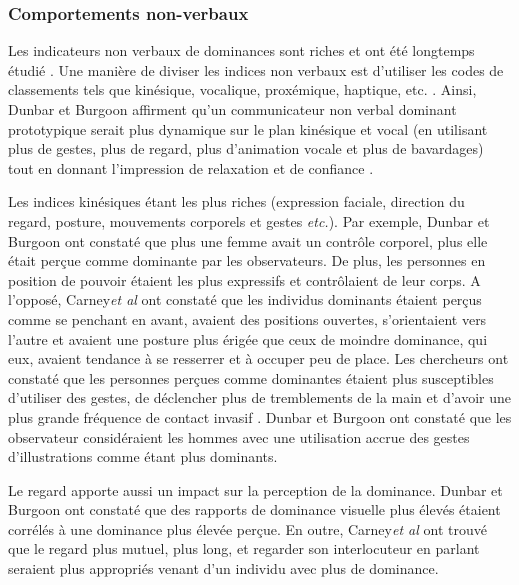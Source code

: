 		\subsubsection{Comportements non-verbaux}
			Les indicateurs non verbaux de dominances sont riches et ont été longtemps étudié \cite{burgoon1995interpersonal,burgoon1998nature}. Une manière de diviser les indices non verbaux est d'utiliser les codes de classements tels que kinésique, vocalique, proxémique, haptique, etc. \cite{burgoon2006nonverbal}. Ainsi, Dunbar et Burgoon \cite{dunbar2005perceptions} affirment qu'un communicateur non verbal dominant prototypique serait plus dynamique sur le plan kinésique et vocal (en utilisant plus de gestes, plus de regard, plus d'animation vocale et plus de bavardages) tout en donnant l'impression de relaxation et de confiance .
			
			 Les indices kinésiques étant les plus riches (expression faciale, direction du regard, posture, mouvements corporels et gestes \emph{etc.}).
			Par exemple, Dunbar et Burgoon \cite{dunbar2005perceptions} ont constaté que plus une femme avait un contrôle corporel, plus elle était perçue comme dominante par les observateurs. De plus, les personnes en position de pouvoir  étaient les plus expressifs et  contrôlaient de leur corps.
			A l'opposé,  Carney\emph{et al}\cite{hall2005nonverbal} ont constaté que les individus dominants étaient perçus comme se penchant en avant, avaient des positions ouvertes, s'orientaient vers l'autre et avaient une posture plus érigée que ceux de moindre dominance, qui eux, avaient tendance à se resserrer et à occuper peu de place. Les chercheurs ont constaté que les personnes perçues comme dominantes étaient plus susceptibles d'utiliser des gestes, de déclencher plus de tremblements de la main et d'avoir une plus grande fréquence de contact invasif \cite{hall2005nonverbal}.
			 Dunbar et Burgoon \cite{dunbar2005perceptions} ont constaté que les observateur considéraient les hommes avec une utilisation accrue des gestes d'illustrations comme étant plus dominants.
			
			Le regard apporte aussi un impact sur la perception de la dominance. Dunbar et Burgoon \cite{dunbar2005perceptions} ont constaté que des rapports de dominance visuelle plus élevés étaient corrélés à une dominance plus élevée perçue. En outre, Carney\emph{et al} \cite{hall2005nonverbal} ont trouvé que le regard plus mutuel, plus long, et regarder son interlocuteur en parlant seraient plus appropriés venant d'un individu avec plus de dominance.
			
